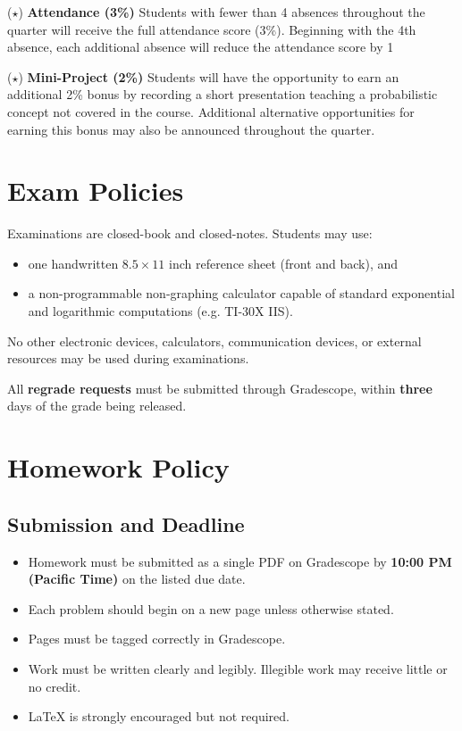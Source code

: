 \documentclass[11pt]{article}
\begin{document}
\newpage
($\star$) 
\textbf{Attendance (3\%)} Students with fewer than 4 absences throughout the quarter will receive the full attendance score (3\%). Beginning with the 4th absence, each additional absence will reduce the attendance score by 1%

($\star$)  \textbf{Mini-Project (2\%)} Students will have the opportunity to earn an additional 2\% bonus by recording a short presentation teaching a probabilistic concept not covered in the course. Additional alternative opportunities for earning this bonus may also be announced throughout the quarter.



\section{Exam Policies}
Examinations are closed-book and closed-notes. Students may use:
\begin{itemize}
    \item one handwritten $8.5 \times 11$ inch reference sheet (front and back), and
        \item a non-programmable non-graphing  calculator capable of standard exponential and logarithmic computations (e.g. TI-30X IIS). 
\end{itemize}

No other electronic devices, calculators, communication devices, or external resources may be used during examinations. 


All \textbf{regrade requests} must be submitted through Gradescope, within \textbf{three} days of the grade being released. 





\section{Homework  Policy}

\subsection{Submission and Deadline}

\begin{itemize}[leftmargin=*]
    \item Homework must be submitted as a single PDF on Gradescope by \textbf{10:00 PM (Pacific Time)} on the listed due date.
    \item Each problem should begin on a new page unless otherwise stated.
    \item Pages must be tagged correctly in Gradescope.
    \item Work must be written clearly and legibly. Illegible work may receive little or no credit.
    \item LaTeX is strongly encouraged but not required.
\end{itemize}
\end{document}

